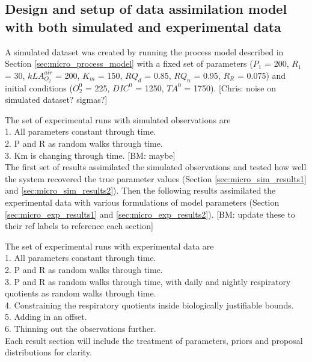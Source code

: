\documentclass{ruthesis}
\begin{document}
\subsection{Design and setup of data assimilation model with both simulated and experimental data}

A simulated dataset was created by running the process model described in Section \ref{sec:micro_process_model} with a fixed set of parameters ($P_1$ = 200, $R_1$ = 30, $kLA_{O_2}^{air}$ = 200, $K_m$ = 150, $RQ_d$ = 0.85, $RQ_n$ = 0.95, $R_R$ = 0.075) and initial conditions ($O_2^0$ = 225, $DIC^0$ = 1250, $TA^0$ = 1750). 
[Chris: noise on simulated dataset? sigmas?]

The set of experimental runs with simulated observations are\\
1. All parameters constant through time.\\
2. P and R as random walks through time.\\
3. Km is changing through time. [BM: maybe]\\


The first set of results assimilated the simulated observations and tested how well the system recovered the true parameter values (Section \ref{sec:micro_sim_results1} and \ref{sec:micro_sim_results2}). Then the following results assimilated the experimental data with various formulations of model parameters (Section \ref{sec:micro_exp_results1} and \ref{sec:micro_exp_results2}). [BM: update these to their ref labels to reference each section]

The set of experimental runs with experimental data are\\
1. All parameters constant through time.\\
2. P and R as random walks through time.\\
3. P and R as random walks through time, with daily and nightly respiratory quotients as random walks through time. \\
4. Constraining the respiratory quotients inside biologically justifiable bounds.\\
5. Adding in an offset.\\
6. Thinning out the observations further.\\

Each result section will include the treatment of parameters, priors and proposal distributions for clarity.  
\end{document}
